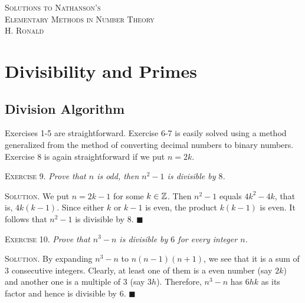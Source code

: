 \documentclass[11pt, leqno]{article}
\newcommand{\done}{\ensuremath{\blacksquare}}
\begin{document}
\setlength{\abovedisplayskip}{0pt}
\setlength{\belowdisplayskip}{0pt}
\setlength{\abovedisplayshortskip}{0pt}
\setlength{\belowdisplayshortskip}{0pt}

\thispagestyle{empty}

\pagebreak
\hspace{0pt}
\vfill
\begin{center}
  \Large
  \textsc{Solutions to Nathanson's \\
    Elementary Methods in Number Theory} \\
  \vspace{1em}
  \large
  \textsc{H. Ronald}
\end{center}
\vfill
\hspace{0pt}
\pagebreak

\clearpage

\thispagestyle{empty}

\tableofcontents
\clearpage

\normalsize
\section{Divisibility and Primes}

\subsection{Division Algorithm}

Exercises 1-5 are straightforward. Exercise 6-7 is easily solved using a method generalized from the method of converting decimal numbers to binary numbers. Exercise 8 is again straightforward if we put $n=2k$.

\textsc{Exercise 9}. \emph{Prove that $n$ is odd, then $n^2-1$ is divisible by $8$.}

\textsc{Solution}. We put $n=2k-1$ for some $k\in\mathbb{Z}$. Then $n^2-1$ equals $4k^2-4k$, that is, $4k(k-1)$. Since either $k$ or $k-1$ is even, the product $k(k-1)$ is even. It follows that $n^2-1$ is divisible by $8$. \done

\textsc{Exercise 10}. \emph{Prove that $n^3-n$ is divisible by $6$ for every integer $n$.}

\textsc{Solution}. By expanding $n^3-n$ to $n(n-1)(n+1)$, we see that it is a sum of $3$ consecutive integers. Clearly, at least one of them is a even number (say $2k$) and another one is a multiple of $3$ (say $3h$). Therefore, $n^3-n$ has $6hk$ as its factor and hence is divisible by $6$. \done
\end{document}
